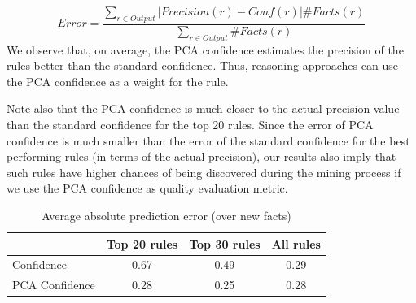 \[
 Error = \frac{\sum \limits_{r \in Output}{|Precision(r)-Conf(r)|\#Facts(r)}}{\sum \limits_{r \in Output}{\#Facts(r)}}
\]
%
We observe that, on average, the PCA confidence estimates the precision of the rules better than the standard confidence.
Thus, reasoning approaches can use the PCA confidence as a weight for the rule.

Note also that the PCA confidence is much closer to the actual precision value than the standard confidence for the top 20 rules.
Since the error of PCA confidence is much smaller than the error of the standard confidence for the best performing rules (in terms of the actual precision),
our results also imply that such rules have higher chances of being discovered during the mining process if we use the PCA confidence as quality evaluation metric.


\begin{table}
\small
\begin{tabular}{l|ccc}
		& Top 20 rules 	&Top 30 rules	&All rules	\\
\hline
Confidence 	& 0.67		&0.49		&0.29 \\
PCA Confidence 	& 0.28		&0.25		&0.28 \\
\end{tabular}
\caption{Average absolute prediction error (over new facts)}
\label{cor-new}
\end{table}


